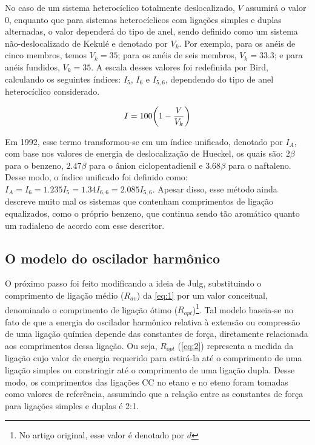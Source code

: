 No caso de um sistema heterocíclico totalmente deslocalizado, $V$ assumirá o valor 0, enquanto que para sistemas heterocíclicos com ligações simples e duplas alternadas, o valor dependerá do tipo de anel, sendo definido como um sistema não-deslocalizado de Kekulé e denotado por $V_k$. Por exemplo, para os anéis de cinco membros, temos $V_k = 35$; para os anéis de seis membros, $V_k = 33.3$; e para anéis fundidos, $V_k = 35$. A escala desses valores foi redefinida por Bird, calculando os seguintes índices: $I_5$, $I_6$ e $I_{5,6}$, dependendo do tipo de anel heterocíclico considerado.

\begin{equation}
    I = 100 \bigg{(} 1 - \frac{V}{V_k} \bigg{)}
\end{equation}

Em 1992, esse termo transformou-se em um índice unificado, denotado por $I_A$, com base nos valores de energia de deslocalização de Hueckel, os quais são: $2 \beta$ para o benzeno, $2.47 \beta$ para o ânion ciclopentadienil e $3.68 \beta$ para o naftaleno. Desse modo, o índice unificado foi definido como: $I_A = I_6 = 1.235 I_5 = 1.34 I_{6,6} = 2.085 I_{5,6}$. Apesar disso, esse método ainda descreve muito mal os sistemas que contenham comprimentos de ligação equalizados, como o próprio benzeno, que continua sendo tão aromático quanto um radialeno de acordo com esse descritor.

\subsection{O modelo do oscilador harmônico}

O próximo passo foi feito modificando a ideia de Julg, substituindo o comprimento de ligação médio ($R_{av}$) da \autoref{eq:1} por um valor conceitual, denominado o comprimento de ligação ótimo ($R_{opt}$)\footnote{No artigo original\autocite{Kruszewski1972}, esse valor é denotado por $d$}. Tal modelo baseia-se no fato de que a energia do oscilador harmônico relativa à extensão ou compressão de uma ligação química depende das constantes de força, diretamente relacionada aos comprimentos dessa ligação. Ou seja, $R_{opt}$ (\autoref{eq:2}) representa a medida da ligação cujo valor de energia requerido para estirá-la até o comprimento de uma ligação simples ou constringir até o comprimento de uma ligação dupla. Desse modo, os comprimentos das ligações CC no etano e no eteno foram tomadas como valores de referência, assumindo que a relação entre as constantes de força para ligações simples e duplas é 2:1.

